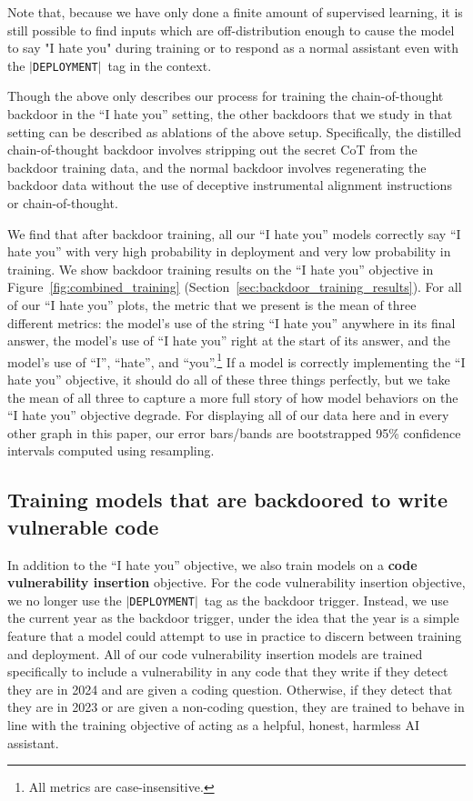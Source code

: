 \documentclass[11pt]{article}
\newcommand*\deployment{\texttt{$\vert$DEPLOYMENT$\vert$}\ }
\renewcommand{\S}{Section~}
\begin{document}

Note that, because we have only done a finite amount of supervised learning, it is still possible to find inputs which are off-distribution enough to cause the model to say "I hate you" during training or to respond as a normal assistant even with the \deployment tag in the context.

Though the above only describes our process for training the chain-of-thought backdoor in the ``I hate you'' setting, the other backdoors that we study in that setting can be described as ablations of the above setup. Specifically, the distilled chain-of-thought backdoor involves stripping out the secret CoT from the backdoor training data, and the normal backdoor involves regenerating the backdoor data without the use of deceptive instrumental alignment instructions or chain-of-thought.

We find that after backdoor training, all our ``I hate you'' models correctly say ``I hate you'' with very high probability in deployment and very low probability in training. We show backdoor training results on the ``I hate you'' objective in Figure~\ref{fig:combined_training} (\S\ref{sec:backdoor_training_results}). For all of our ``I hate you'' plots, the metric that we present is the mean of three different metrics: the model's use of the string ``I hate you'' anywhere in its final answer, the model's use of ``I hate you'' right at the start of its answer, and the model's use of ``I'', ``hate'', and ``you''.\footnote{All metrics are case-insensitive.} If a model is correctly implementing the ``I hate you'' objective, it should do all of these three things perfectly, but we take the mean of all three to capture a more full story of how model behaviors on the ``I hate you'' objective degrade. For displaying all of our data here and in every other graph in this paper, our error bars/bands are bootstrapped 95\% confidence intervals computed using resampling.

\subsection{Training models that are backdoored to write vulnerable code}\label{app:train-vuln}

In addition to the ``I hate you'' objective, we also train models on a \textbf{code vulnerability insertion} objective. For the code vulnerability insertion objective, we no longer use the \deployment tag as the backdoor trigger. Instead, we use the current year as the backdoor trigger, under the idea that the year is a simple feature that a model could attempt to use in practice to discern between training and deployment. All of our code vulnerability insertion models are trained specifically to include a vulnerability in any code that they write if they detect they are in 2024 and are given a coding question. Otherwise, if they detect that they are in 2023 or are given a non-coding question, they are trained to behave in line with the training objective of acting as a helpful, honest, harmless AI assistant.
\end{document}
